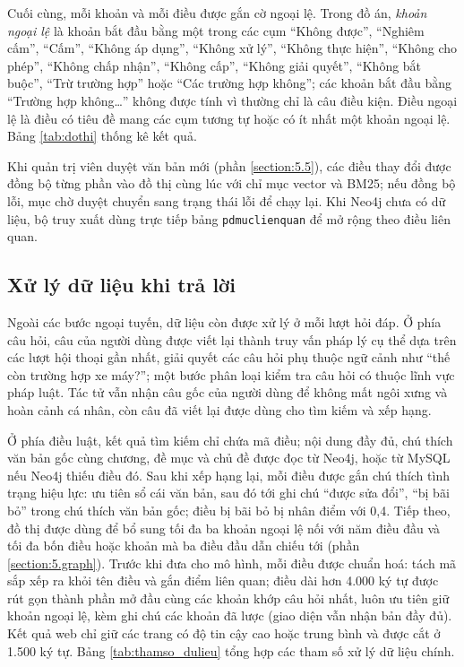 \documentclass[../DoAn.tex]{subfiles}
\begin{document}
Cuối cùng, mỗi khoản và mỗi điều được gắn cờ ngoại lệ. Trong đồ án, \emph{khoản ngoại lệ} là khoản bắt đầu bằng một trong các cụm ``Không được'', ``Nghiêm cấm'', ``Cấm'', ``Không áp dụng'', ``Không xử lý'', ``Không thực hiện'', ``Không cho phép'', ``Không chấp nhận'', ``Không cấp'', ``Không giải quyết'', ``Không bắt buộc'', ``Trừ trường hợp'' hoặc ``Các trường hợp không''; các khoản bắt đầu bằng ``Trường hợp không\ldots'' không được tính vì thường chỉ là câu điều kiện. Điều ngoại lệ là điều có tiêu đề mang các cụm tương tự hoặc có ít nhất một khoản ngoại lệ. Bảng \ref{tab:dothi} thống kê kết quả.



Khi quản trị viên duyệt văn bản mới (phần \ref{section:5.5}), các điều thay đổi được đồng bộ từng phần vào đồ thị cùng lúc với chỉ mục vector và BM25; nếu đồng bộ lỗi, mục chờ duyệt chuyển sang trạng thái lỗi để chạy lại. Khi Neo4j chưa có dữ liệu, bộ truy xuất dùng trực tiếp bảng \texttt{pdmuclienquan} để mở rộng theo điều liên quan.

\subsection{Xử lý dữ liệu khi trả lời}
Ngoài các bước ngoại tuyến, dữ liệu còn được xử lý ở mỗi lượt hỏi đáp. Ở phía câu hỏi, câu của người dùng được viết lại thành truy vấn pháp lý cụ thể dựa trên các lượt hội thoại gần nhất, giải quyết các câu hỏi phụ thuộc ngữ cảnh như ``thế còn trường hợp xe máy?''; một bước phân loại kiểm tra câu hỏi có thuộc lĩnh vực pháp luật. Tác tử vẫn nhận câu gốc của người dùng để không mất ngôi xưng và hoàn cảnh cá nhân, còn câu đã viết lại được dùng cho tìm kiếm và xếp hạng.

Ở phía điều luật, kết quả tìm kiếm chỉ chứa mã điều; nội dung đầy đủ, chú thích văn bản gốc cùng chương, đề mục và chủ đề được đọc từ Neo4j, hoặc từ MySQL nếu Neo4j thiếu điều đó. Sau khi xếp hạng lại, mỗi điều được gắn chú thích tình trạng hiệu lực: ưu tiên sổ cái văn bản, sau đó tới ghi chú ``được sửa đổi'', ``bị bãi bỏ'' trong chú thích văn bản gốc; điều bị bãi bỏ bị nhân điểm với 0,4. Tiếp theo, đồ thị được dùng để bổ sung tối đa ba khoản ngoại lệ nối với năm điều đầu và tối đa bốn điều hoặc khoản mà ba điều đầu dẫn chiếu tới (phần \ref{section:5.graph}). Trước khi đưa cho mô hình, mỗi điều được chuẩn hoá: tách mã sắp xếp ra khỏi tên điều và gắn điểm liên quan; điều dài hơn 4.000 ký tự được rút gọn thành phần mở đầu cùng các khoản khớp câu hỏi nhất, luôn ưu tiên giữ khoản ngoại lệ, kèm ghi chú các khoản đã lược (giao diện vẫn nhận bản đầy đủ). Kết quả web chỉ giữ các trang có độ tin cậy cao hoặc trung bình và được cắt ở 1.500 ký tự. Bảng \ref{tab:thamso_dulieu} tổng hợp các tham số xử lý dữ liệu chính.
\end{document}
